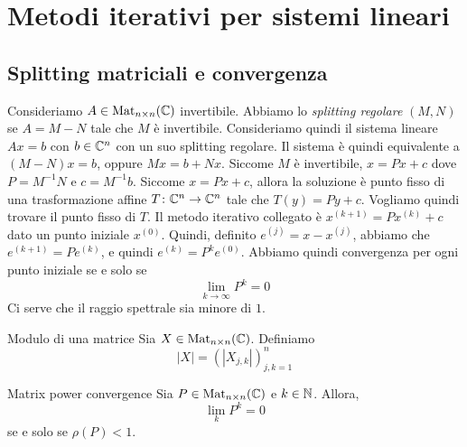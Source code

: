 \documentclass[a4paper]{article}
\begin{document}

\section{Metodi iterativi per sistemi lineari}

\subsection{Splitting matriciali e convergenza}

Consideriamo \(A \in \operatorname{Mat}_{n\times n}(\mathbb{C})\)
invertibile.
Abbiamo lo \emph{splitting regolare} \((M, N)\)
se \(A = M-N\)
tale che \(M\) è invertibile.
Consideriamo quindi il sistema lineare \(Ax = b\) con \(b \in \mathbb{C}^n\)
con un suo splitting regolare.
Il sistema è quindi equivalente a \((M-N)x = b\),
oppure \(Mx = b + Nx\).
Siccome \(M\) è invertibile, \(x = Px + c\)
dove \(P = M^{-1}N\) e \(c = M^{-1}b\).
Siccome \(x=Px + c\), allora la soluzione è punto fisso di una trasformazione affine
\(T\colon \mathbb{C}^n \to \mathbb{C}^n\)
tale che \(T(y) = Py + c\).
Vogliamo quindi trovare il punto fisso di \(T\).
Il metodo iterativo collegato è
\(x^{(k+1)} = Px^{(k)} + c\) dato un punto iniziale \(x^{(0)}\).
Quindi, definito \(e^{(j)} = x - x^{(j)}\), abbiamo che
\(e^{(k+1)} = Pe^{(k)}\), e quindi \(e^{(k)} = P^k e^{(0)}\).
Abbiamo quindi convergenza per ogni punto iniziale se e solo se \[
    \lim_{k \to \infty} P^k = 0
\]
Ci serve che il raggio spettrale sia minore di \(1\).

\begin{snippetdefinition}{Modulo di una matrice}
    Sia \(X \in \operatorname{Mat}_{n \times n}(\mathbb{C})\).
    Definiamo
    \[
        |X| = \left(|X_{j,k}|\right)_{j,k=1}^n
    \]
\end{snippetdefinition}

\begin{snippettheorem}{Matrix power convergence}
    Sia \(P \in \operatorname{Mat}_{n\times n}(\mathbb{C})\) e \(k \in \mathbb{N}\). Allora,
    \[
        \lim_k P^k = 0
    \]
    se e solo se \(\rho(P) < 1\).
\end{snippettheorem}
\end{document}

